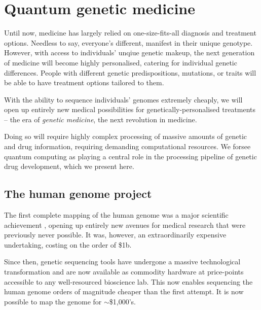 %
%

\section{Quantum genetic medicine}




Until now, medicine has largely relied on one-size-fits-all diagnosis and treatment options. Needless to say, everyone's different, manifest in their unique genotype. However, with access to individuals' unqiue genetic makeup, the next generation of medicine will become highly personalised, catering for individual genetic differences. People with different genetic predispositions, mutations, or traits will be able to have treatment options tailored to them.

With the ability to sequence individuals' genomes extremely cheaply, we will open up entirely new medical possibilities for genetically-personalised treatments -- the era of \textit{genetic medicine}, the next revolution in medicine.

Doing so will require highly complex processing of massive amounts of genetic and drug information, requiring demanding computational resources. We forsee quantum computing as playing a central role in the processing pipeline of genetic drug development, which we present here.

%
%

\subsection{The human genome project}

The first complete mapping of the human genome was a major scientific achievement \cite{humanGenomeProject}, opening up entirely new avenues for medical research that were previously never possible. It was, however, an extraordinarily expensive undertaking, costing on the order of \$1b.

Since then, genetic sequencing tools have undergone a massive technological transformation and are now available as commodity hardware at price-points accessible to any well-resourced bioscience lab. This now enables sequencing the human genome orders of magnitude cheaper than the first attempt. It is now possible to map the genome for $\sim$\$1,000's.

